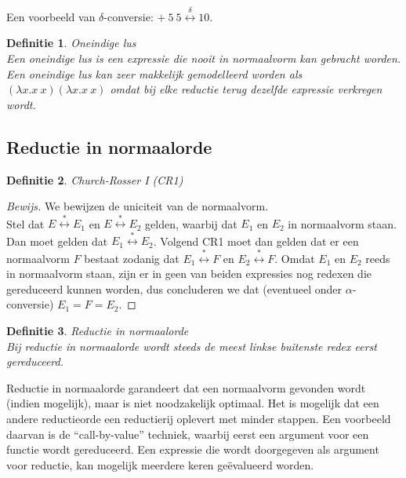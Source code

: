 \documentclass[a4paper]{article}
\newtheorem{tdefinitie}{Definitie}[section]
\newenvironment{definitie}[1]%
  {\begin{mdframed}[backgroundcolor=silver,
    topline=false,
    rightline=false,
    leftline=false,
    bottomline=false]\begin{tdefinitie}#1\\\normalfont}%
  {\end{tdefinitie}\end{mdframed}}
\newenvironment{bewijs}[1]%
  {\begin{mdframed}[topline=true,
    rightline=true,
    leftline=true,
    bottomline=true]\begin{proof}[Bewijs]#1\\[.2cm]\normalfont}%
  {\end{proof}\end{mdframed}}
\begin{document}
Een voorbeeld van $\delta$-conversie: $+\ 5\ 5 \stackrel{\delta}{\longleftrightarrow} 10$.


\begin{definitie}{Oneindige lus}
  Een oneindige lus is een expressie die nooit in normaalvorm kan gebracht worden. Een oneindige lus kan zeer makkelijk gemodelleerd worden als $(\lambda x. x\ x)(\lambda x. x\ x)$ omdat bij elke reductie terug dezelfde expressie verkregen wordt.
\end{definitie}

\subsection{Reductie in normaalorde}

\begin{definitie}{Church-Rosser I (CR1)}
  
\end{definitie}

\begin{bewijs}{We bewijzen de uniciteit van de normaalvorm.}
  Stel dat $E \stackrel{*}{\longleftrightarrow} E_1$ en $E \stackrel{*}{\longleftrightarrow} E_2$ gelden, waarbij dat $E_1$ en $E_2$ in normaalvorm staan. Dan moet gelden dat $E_1 \stackrel{*}{\longleftrightarrow} E_2$. Volgend CR1 moet dan gelden dat er een normaalvorm $F$ bestaat zodanig dat $E_1 \stackrel{*}{\longleftrightarrow} F$ en $E_2 \stackrel{*}{\longleftrightarrow} F$. Omdat $E_1$ en $E_2$ reeds in normaalvorm staan, zijn er in geen van beiden expressies nog redexen die gereduceerd kunnen worden, dus concluderen we dat (eventueel onder $\alpha$-conversie) $E_1 = F = E_2$.
\end{bewijs}

\begin{definitie}{Reductie in normaalorde}
Bij reductie in normaalorde wordt steeds de meest linkse buitenste redex eerst gereduceerd.
\end{definitie}

Reductie in normaalorde garandeert dat een normaalvorm gevonden wordt (indien mogelijk), maar is niet noodzakelijk optimaal. Het is mogelijk dat een andere reductieorde een reductierij oplevert met minder stappen. Een voorbeeld daarvan is de ``call-by-value'' techniek, waarbij eerst een argument voor een functie wordt gereduceerd. Een expressie die wordt doorgegeven als argument voor reductie, kan mogelijk meerdere keren ge\"evalueerd worden.
\end{document}
